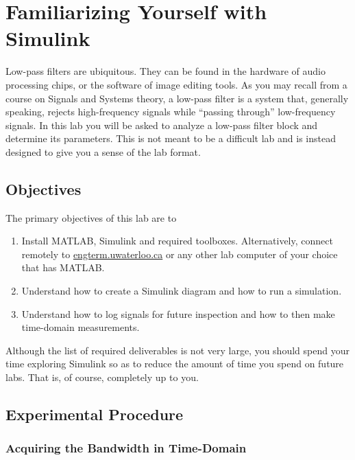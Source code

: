 \documentclass[letterpaper, 12pt, oneside]{memoir}
\begin{document}

\mainmatter

\chapter{Familiarizing Yourself with Simulink}\label{Lab:1}
Low-pass filters are ubiquitous. They can be found in the hardware of
audio processing chips, or the software of image editing tools. As you may
recall from a course on Signals and Systems theory, a low-pass filter
is a system that, generally speaking, rejects high-frequency signals while
``passing through'' low-frequency signals. In this lab you will be asked
to analyze a low-pass filter block and determine its parameters. This is not
meant to be a difficult lab and is instead designed to give you a sense of the
lab format.


\section{Objectives}
The primary objectives of this lab are to
\begin{enumerate}[label=(\arabic*)]
  \item{
    Install MATLAB, Simulink and required toolboxes.
    Alternatively, connect remotely to
    \url{engterm.uwaterloo.ca} or any other lab computer of your choice
    that has MATLAB.
  }
  \item{
    Understand how to create a Simulink diagram and how to run
    a simulation.
  }
  \item{
    Understand how to log signals for future inspection and how to then
    make time-domain measurements.
  }
\end{enumerate}
Although the list of required deliverables is not very large, you should
spend your time exploring Simulink so as to reduce the amount of time
you spend on future labs. That is, of course, completely up to you.

\section{Experimental Procedure}

\subsection{Acquiring the Bandwidth in Time-Domain}
\end{document}
